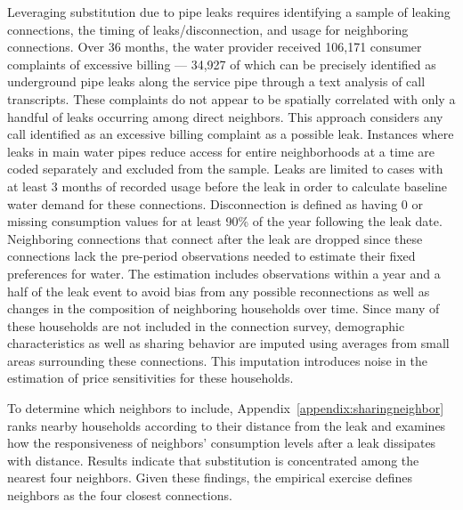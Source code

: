 \documentclass[12pt]{article}
\begin{document}
Leveraging substitution due to pipe leaks requires identifying a sample of leaking connections, the timing of leaks/disconnection, and usage for neighboring connections.  Over 36 months, the water provider received 106,171 consumer complaints of excessive billing --- 34,927 of which can be precisely identified as underground pipe leaks along the service pipe through a text analysis of call transcripts.  These complaints do not appear to be spatially correlated with only a handful of leaks occurring among direct neighbors.  This approach considers any call identified as an excessive billing complaint as a possible leak.  Instances where leaks in main water pipes reduce access for entire neighborhoods at a time are coded separately and excluded from the sample.  Leaks are limited to cases with at least 3 months of recorded usage before the leak in order to calculate baseline water demand for these connections.  Disconnection is defined as having 0 or missing consumption values for at least 90\% of the year following the leak date.  Neighboring connections that connect after the leak are dropped since these connections lack the pre-period observations needed to estimate their fixed preferences for water.  The estimation includes observations within a year and a half of the leak event to avoid bias from any possible reconnections as well as changes in the composition of neighboring households over time.  Since many of these households are not included in the connection survey, demographic characteristics as well as sharing behavior are imputed using averages from small areas surrounding these connections.  This imputation introduces noise in the estimation of price sensitivities for these households.

To determine which neighbors to include, Appendix~\ref{appendix:sharingneighbor} ranks nearby households according to their distance from the leak and examines how the responsiveness of neighbors' consumption levels after a leak dissipates with distance.  Results indicate that substitution is concentrated among the nearest four neighbors.  Given these findings, the empirical exercise defines neighbors as the four closest connections.  
\end{document}
